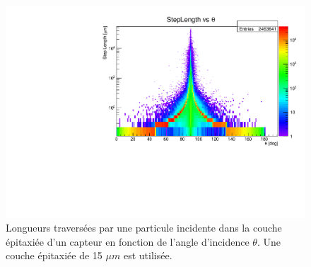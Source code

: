   \begin{figure}[!htb]
    \begin{center}
      \includegraphics[scale=0.65]{./figures/sensors_Readout_Time/stepLength_vs_theta_epi15um.pdf}
      \caption{Longueurs travers\'ees par une particule incidente dans la couche \'epitaxi\'ee d'un capteur en fonction de l'angle d'incidence $\theta$. Une couche \'epitaxi\'ee de 15 $\mu m$ est utilis\'ee.}
      \label{fig:StepLength_vs_theta}
    \end{center}
  \end{figure}
 
  \medskip
 

